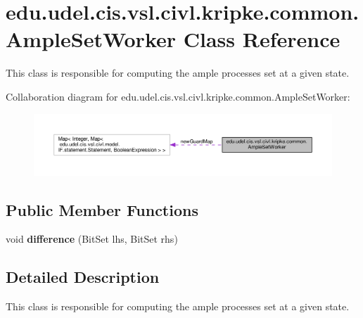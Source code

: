 \hypertarget{classedu_1_1udel_1_1cis_1_1vsl_1_1civl_1_1kripke_1_1common_1_1AmpleSetWorker}{}\section{edu.\+udel.\+cis.\+vsl.\+civl.\+kripke.\+common.\+Ample\+Set\+Worker Class Reference}
\label{classedu_1_1udel_1_1cis_1_1vsl_1_1civl_1_1kripke_1_1common_1_1AmpleSetWorker}


This class is responsible for computing the ample processes set at a given state.  




Collaboration diagram for edu.\+udel.\+cis.\+vsl.\+civl.\+kripke.\+common.\+Ample\+Set\+Worker\+:
\nopagebreak
\begin{figure}[H]
\begin{center}
\leavevmode
\includegraphics[width=350pt]{classedu_1_1udel_1_1cis_1_1vsl_1_1civl_1_1kripke_1_1common_1_1AmpleSetWorker__coll__graph}
\end{center}
\end{figure}
\subsection*{Public Member Functions}
\begin{DoxyCompactItemize}
\item 
\hypertarget{classedu_1_1udel_1_1cis_1_1vsl_1_1civl_1_1kripke_1_1common_1_1AmpleSetWorker_a3314d8eb02d8124fe1b91a49558923a0}{}void {\bfseries difference} (Bit\+Set lhs, Bit\+Set rhs)\label{classedu_1_1udel_1_1cis_1_1vsl_1_1civl_1_1kripke_1_1common_1_1AmpleSetWorker_a3314d8eb02d8124fe1b91a49558923a0}

\end{DoxyCompactItemize}


\subsection{Detailed Description}
This class is responsible for computing the ample processes set at a given state. 


